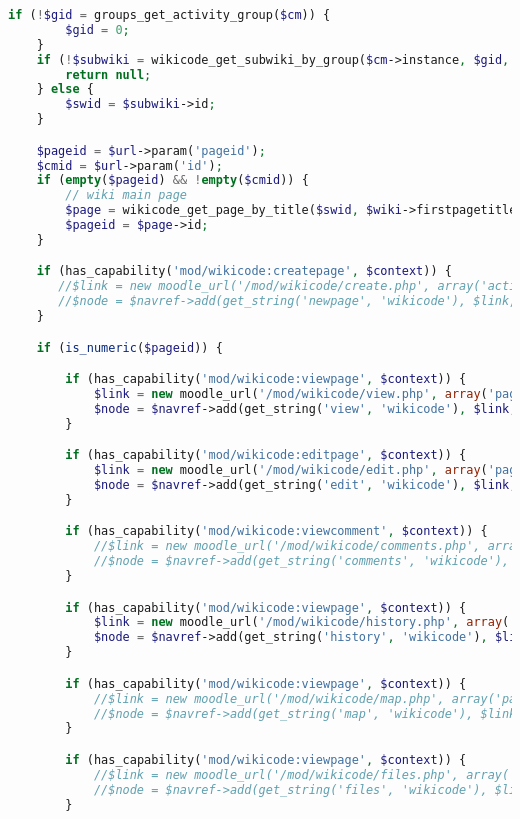\begin{lstlisting}[language=PHP]
    if (!$gid = groups_get_activity_group($cm)) {
        $gid = 0;
    }
    if (!$subwiki = wikicode_get_subwiki_by_group($cm->instance, $gid, $userid)) {
        return null;
    } else {
        $swid = $subwiki->id;
    }

    $pageid = $url->param('pageid');
    $cmid = $url->param('id');
    if (empty($pageid) && !empty($cmid)) {
        // wiki main page
        $page = wikicode_get_page_by_title($swid, $wiki->firstpagetitle);
        $pageid = $page->id;
    }

    if (has_capability('mod/wikicode:createpage', $context)) {
       //$link = new moodle_url('/mod/wikicode/create.php', array('action' => 'new', 'swid' => $swid));
       //$node = $navref->add(get_string('newpage', 'wikicode'), $link, navigation_node::TYPE_SETTING);
    }

    if (is_numeric($pageid)) {

        if (has_capability('mod/wikicode:viewpage', $context)) {
            $link = new moodle_url('/mod/wikicode/view.php', array('pageid' => $pageid));
            $node = $navref->add(get_string('view', 'wikicode'), $link, navigation_node::TYPE_SETTING);
        }

        if (has_capability('mod/wikicode:editpage', $context)) {
            $link = new moodle_url('/mod/wikicode/edit.php', array('pageid' => $pageid));
            $node = $navref->add(get_string('edit', 'wikicode'), $link, navigation_node::TYPE_SETTING);
        }

        if (has_capability('mod/wikicode:viewcomment', $context)) {
            //$link = new moodle_url('/mod/wikicode/comments.php', array('pageid' => $pageid));
            //$node = $navref->add(get_string('comments', 'wikicode'), $link, navigation_node::TYPE_SETTING);
        }

        if (has_capability('mod/wikicode:viewpage', $context)) {
            $link = new moodle_url('/mod/wikicode/history.php', array('pageid' => $pageid));
            $node = $navref->add(get_string('history', 'wikicode'), $link, navigation_node::TYPE_SETTING);
        }

        if (has_capability('mod/wikicode:viewpage', $context)) {
            //$link = new moodle_url('/mod/wikicode/map.php', array('pageid' => $pageid));
            //$node = $navref->add(get_string('map', 'wikicode'), $link, navigation_node::TYPE_SETTING);
        }

        if (has_capability('mod/wikicode:viewpage', $context)) {
            //$link = new moodle_url('/mod/wikicode/files.php', array('pageid' => $pageid));
            //$node = $navref->add(get_string('files', 'wikicode'), $link, navigation_node::TYPE_SETTING);
        }


\end{lstlisting}

